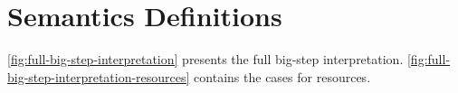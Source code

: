 \section{Semantics Definitions}
\label{sec:semant-defin}

% 




\cref{fig:full-big-step-interpretation} presents  the full big-step
interpretation. \cref{fig:full-big-step-interpretation-resources}
contains the cases for resources.

